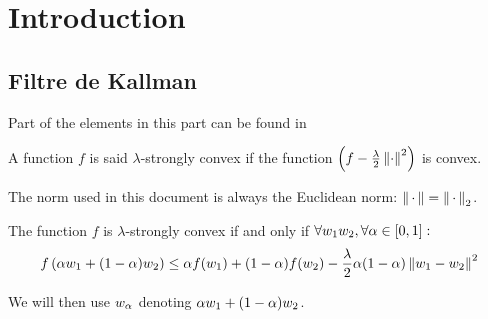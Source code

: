 \documentclass{article}
\begin{document}
\sloppy
{}


\section{Introduction}
\label{sec:introduction}


\subsection{Filtre de Kallman}


Part of the elements in this part can be found in \cite{Hiriart-Urruty_Lemarechal93,Hiriart-Urruty_Lemarechal93b}
\begin{definition}
A function $f$ is said $\lambda$-strongly convex if the function
$\left(f - \frac{\lambda}{2} \left\| \cdot \right\|^2\right)$ is convex.
\end{definition}

\begin{remark}
The norm used in this document is always the Euclidean norm: $\left\| \,\cdot\, \right\| = \left\| \,\cdot\, \right\|_2$.
\end{remark}


\begin{proposition}
The function $f$ is $\lambda$-strongly convex if and only if $
\forall w_1 w_2, \forall \alpha \in [0,1]:$
\begin{equation}\label{eq:strong}
f\left(\alpha w_1 + (1-\alpha) w_2\right)
\leq
\alpha f(w_1) + (1-\alpha) f(w_2) - \frac{\lambda}{2} \alpha (1-\alpha) \left\| w_1-w_2 \right\|^2
\end{equation}
\end{proposition}


We will then use $w_{\alpha}$ denoting $\alpha w_1 + (1-\alpha) w_2$.
\end{document}
